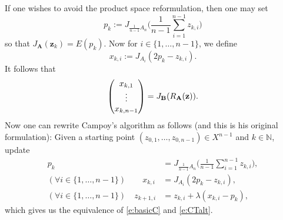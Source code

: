 \documentclass[11pt]{article}
\newcommand{\bz}{\ensuremath{\mathbf{z}}}
\newcommand{\NN}{\ensuremath{\mathbb N}}
\newcommand{\bA}{\ensuremath{{\mathbf{A}}}}
\newcommand{\bB}{\ensuremath{{\mathbf{B}}}}
\theoremstyle{definition}
\providecommand{\NN}{\mathbb{N}}
\providecommand{\NN}{\mathbb{N}}
\begin{document}
{If one wishes to avoid the product space reformulation, then one may set
\begin{equation*}
p_k:=J_{\frac{1}{n-1}A_n}\Big(\frac{1}{n-1}\sum_{i=1}^{n-1} z_{k,i}\Big)
\end{equation*}
so that $J_{\bA}(\bz_k)=E(p_k)$. 
Now for $i\in \{1,\dots,n-1\}$, we define
\begin{equation*}
x_{k,i}:=J_{A_i}(2p_k-z_{k,i}).
\end{equation*}
It follows that
\begin{equation*}
\begin{pmatrix}
x_{k,1}\\\vdots\\x_{k,n-1}
\end{pmatrix}=J_{\bB}(R_{\hrulefill\bA}(\bz)).
\end{equation*}
Now one can rewrite Campoy's algorithm as follows (and this is
his original formulation):
Given a starting point $(z_{0,1},\ldots,z_{0,n-1})\in X^{n-1}$ and $k\in\NN$, 
update 
\begin{subequations}
\begin{align}
p_k&=J_{\frac{1}{n-1}A_n}\bigg(\frac{1}{n-1}\sum_{i=1}^{n-1} z_{k,i}\bigg),\\
(\forall i\in \{1,\ldots,n-1\})\qquad 
x_{k,i}&=J_{A_i}(2p_k-z_{k,i}),\\
(\forall i\in \{1,\ldots,n-1\})\quad z_{k+1,i}&=z_{k,i}+\lambda(x_{k,i}-p_k),\label{e:CTalt}
\end{align}
\end{subequations}
which gives us the equivalence of \cref{e:basicC} and \cref{e:CTalt}.

}
\end{document}
